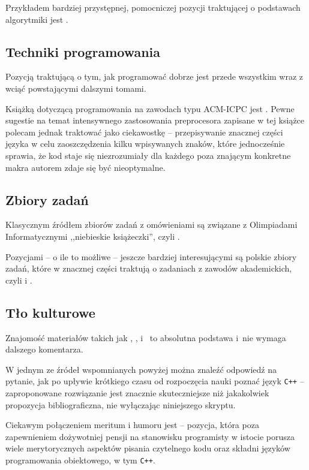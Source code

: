 Przykładem bardziej przystępnej, pomocniczej pozycji traktującej o podstawach
algorytmiki jest .

\subsection{Techniki programowania}

Pozycją traktującą o tym, jak programować dobrze jest przede wszystkim
 wraz z wciąć powstającymi dalszymi tomami.

Książką dotyczącą programowania na zawodach typu ACM-ICPC jest
. Pewne sugestie na temat intensywnego zastosowania
preprocesora zapisane w tej książce polecam jednak traktować jako ciekawostkę
-- przepisywanie znacznej części języka w celu zaoszczędzenia kilku wpisywanych
znaków, które jednocześnie sprawia, że kod staje się niezrozumiały dla każdego
poza znającym konkretne makra autorem zdaje się być nieoptymalne.

\subsection{Zbiory zadań}

Klasycznym źródłem zbiorów zadań z omówieniami są związane z Olimpiadami
Informatycznymi ,,niebieskie książeczki'', czyli .

Pozycjami -- o ile to możliwe -- jeszcze bardziej interesującymi są polskie
zbiory zadań, które w znacznej części traktują o zadaniach z zawodów
akademickich, czyli  i .

\subsection{Tło kulturowe}

Znajomość materiałów takich jak , ,
 i~ to absolutna podstawa i~nie wymaga 
dalszego komentarza.

W jednym ze źródeł wspomnianych powyżej można znaleźć odpowiedź na pytanie,
jak po upływie krótkiego czasu od rozpoczęcia nauki poznać język \texttt{C++}
\cite{abstrusegoose249} -- zaproponowane rozwiązanie jest znacznie
skuteczniejsze niż jakakolwiek propozycja bibliograficzna, nie wyłączając
niniejszego skryptu.

Ciekawym połączeniem meritum i humoru jest  -- pozycja,
która poza zapewnieniem dożywotniej pensji na stanowisku programisty w istocie
porusza wiele merytorycznych aspektów pisania czytelnego kodu oraz składni
języków programowania obiektowego, w tym \texttt{C++}.

